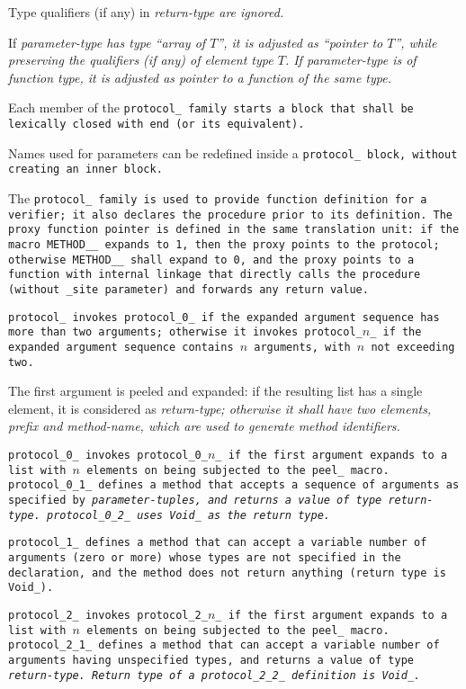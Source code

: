 Type qualifiers (if any) in \it{return-type} are ignored.

If \it{parameter-type} has type ``array of $T$'', it is adjusted as ``pointer
to $T$'', while preserving the qualifiers (if any) of element type $T$.
If \it{parameter-type} is of function type, it is
adjusted as pointer to a function of the same type.

Each member of the \tt{protocol_} family starts a block that
shall be lexically closed with \tt{end} (or its equivalent).

\note Names used for parameters can be redefined inside
a \tt{protocol_} block, without creating an inner block.


The \tt{protocol_} family is used to provide function definition
for a verifier; it also declares the procedure prior to its definition.
The proxy function pointer is defined in the same translation unit: if the
macro \tt{METHOD__} expands to \tt{1}, then the proxy points to the protocol;
otherwise \tt{METHOD__} shall expand to \tt{0}, and the proxy points
to a function with internal linkage that directly calls the procedure
(without \tt{_site} parameter) and forwards any return value.

\tt{protocol_} invokes \tt{protocol_0_} if the expanded argument sequence has
more than two arguments; otherwise it invokes \tt{protocol_}$n$\tt{_} if the
expanded argument sequence contains $n$ arguments, with $n$ not exceeding two.

The first argument is peeled and expanded: if the resulting list
has a single element, it is considered as \it{return-type};
otherwise it shall have two elements, \it{prefix} and
\it{method-name}, which are used to generate method identifiers.

\tt{protocol_0_} invokes \tt{protocol_0_}$n$\_ if the first argument expands
to a list with $n$ elements on being subjected to the \tt{peel_} macro.
\tt{protocol_0_1_} defines a method that accepts a sequence of arguments as
specified by \it{parameter-tuples}, and returns a value of type \it{return-type}.
\tt{protocol_0_2_} uses \tt{Void_} as the return type.

\tt{protocol_1_} defines a method that can accept a variable number of
arguments (zero or more) whose types are not specified in the declaration,
and the method does not return anything (return type is \tt{Void_}).

\tt{protocol_2_} invokes \tt{protocol_2_}$n$\_ if the first argument expands
to a list with $n$ elements on being subjected to the \tt{peel_} macro.
\tt{protocol_2_1_} defines a method that can accept a variable number of
arguments having unspecified types, and returns a value of type \it{return-type}.
Return type of a \tt{protocol_2_2_} definition is \tt{Void_}.

